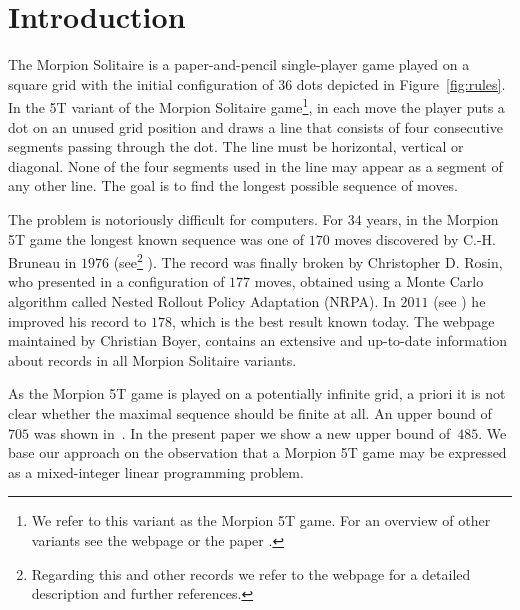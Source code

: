 \section{Introduction}

The Morpion Solitaire is a paper-and-pencil single-player game played on a square grid with the initial configuration
  of $36$ dots depicted in Figure~\ref{fig:rules}.
In the 5T variant of the Morpion Solitaire game\footnote{
We refer to this variant as the Morpion 5T game. For an overview of other variants see the webpage \cite{boyer} or the paper \cite{demaine}.}, in each move the player puts a dot on an unused grid position and draws a line that consists of four consecutive segments passing through the dot. 
The line must be horizontal, vertical or diagonal. None of the four segments used in the line may appear as a segment of any other line.  %
The goal is to find the longest possible sequence of moves.



The problem is notoriously difficult for computers. 
For $34$ years, in the Morpion 5T game the longest known sequence was one of $170$ moves discovered by C.-H. Bruneau in $1976$ (see\footnote{Regarding this and other records we refer to the webpage \cite{boyer} for a detailed description and further references.} \cite{boyer}). %
The record was finally broken by Christopher D. Rosin, who presented in \cite{rosin} a configuration of $177$ moves, obtained using a Monte Carlo algorithm called Nested Rollout Policy Adaptation (NRPA). 
In $2011$ (see \cite{boyer}) he improved his record to $178$, which is the best result known today.
The webpage \cite{boyer} maintained by Christian Boyer, contains an extensive and up-to-date information about records in all Morpion Solitaire variants.

As the Morpion 5T game is played on a potentially infinite grid, a priori it is not clear whether the maximal sequence should be finite at all. 
An upper bound of $705$ was shown in~\cite{demaine}.
In the present paper we show a new upper bound of~$485$. We base our approach on the observation that a Morpion 5T game may be expressed as a mixed-integer linear programming problem.

